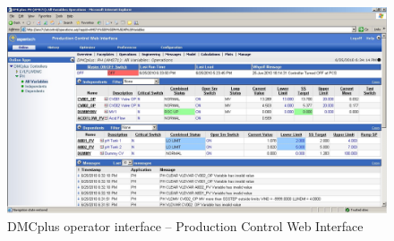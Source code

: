 \begin{landscape}
  \begin{figure}[htbp]
    \centering
      \includegraphics[width=25cm]{graph/ss_dmcpluswebinterface.jpg}
    \caption[DMCplus Production Control Web Interface]{DMCplus operator interface -- Production Control Web Interface}
    \label{fig:ssdmcplusoperator}
  \end{figure}

\end{landscape}

